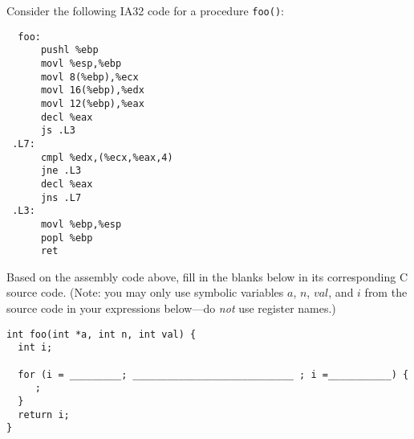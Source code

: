 \begin{problem}{8}
Consider the following IA32 code for a procedure {\tt foo()}:

\begin{verbatim}
  foo:
      pushl %ebp
      movl %esp,%ebp
      movl 8(%ebp),%ecx
      movl 16(%ebp),%edx
      movl 12(%ebp),%eax
      decl %eax
      js .L3
 .L7:
      cmpl %edx,(%ecx,%eax,4)
      jne .L3
      decl %eax
      jns .L7
 .L3:
      movl %ebp,%esp
      popl %ebp
      ret
\end{verbatim}

Based on the assembly code above, fill in the blanks below in its
corresponding C source code.  (Note: you may only use symbolic
variables $a$, $n$, $val$, and $i$ from the source code in your
expressions below---do {\em not} use register names.)

\begin{verbatim}
int foo(int *a, int n, int val) {
  int i;

  for (i = _________; ____________________________ ; i =___________) {
     ;
  }
  return i;
}
\end{verbatim}
\end{problem}





